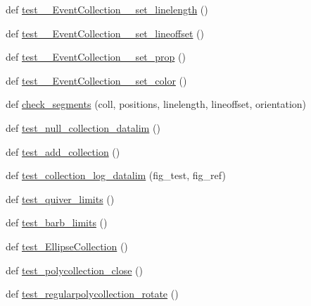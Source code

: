 \begin{DoxyCompactItemize}
\item 
def \hyperlink{namespacematplotlib_1_1tests_1_1test__collections_af6b4833fad5d52aba614b08560a6bb77}{test\+\_\+\+\_\+\+Event\+Collection\+\_\+\+\_\+set\+\_\+linelength} ()
\item 
def \hyperlink{namespacematplotlib_1_1tests_1_1test__collections_a2d8a46d2a0487406a861e6497acc19c7}{test\+\_\+\+\_\+\+Event\+Collection\+\_\+\+\_\+set\+\_\+lineoffset} ()
\item 
def \hyperlink{namespacematplotlib_1_1tests_1_1test__collections_ae122b7fe7b8c0cc3750c0dcf43621996}{test\+\_\+\+\_\+\+Event\+Collection\+\_\+\+\_\+set\+\_\+prop} ()
\item 
def \hyperlink{namespacematplotlib_1_1tests_1_1test__collections_a91efc175c0e126cbe082f3cea61eade2}{test\+\_\+\+\_\+\+Event\+Collection\+\_\+\+\_\+set\+\_\+color} ()
\item 
def \hyperlink{namespacematplotlib_1_1tests_1_1test__collections_ae367299909e7d8974d152b7e0d56e89b}{check\+\_\+segments} (coll, positions, linelength, lineoffset, orientation)
\item 
def \hyperlink{namespacematplotlib_1_1tests_1_1test__collections_af97e3c77c0d05451d621656f7e7c3d27}{test\+\_\+null\+\_\+collection\+\_\+datalim} ()
\item 
def \hyperlink{namespacematplotlib_1_1tests_1_1test__collections_a26cc7e97b0d52ba0c7167510e1150245}{test\+\_\+add\+\_\+collection} ()
\item 
def \hyperlink{namespacematplotlib_1_1tests_1_1test__collections_afba437f619b3bb4b5521586f08089b40}{test\+\_\+collection\+\_\+log\+\_\+datalim} (fig\+\_\+test, fig\+\_\+ref)
\item 
def \hyperlink{namespacematplotlib_1_1tests_1_1test__collections_a62c5c397a791a2b5f17cf2b3259e1539}{test\+\_\+quiver\+\_\+limits} ()
\item 
def \hyperlink{namespacematplotlib_1_1tests_1_1test__collections_a3524385124de4417c3380db9b3920323}{test\+\_\+barb\+\_\+limits} ()
\item 
def \hyperlink{namespacematplotlib_1_1tests_1_1test__collections_a87856a72bd0449245ecc99caa1c57767}{test\+\_\+\+Ellipse\+Collection} ()
\item 
def \hyperlink{namespacematplotlib_1_1tests_1_1test__collections_a65444672bf0694127cd4e6bf086ad97f}{test\+\_\+polycollection\+\_\+close} ()
\item 
def \hyperlink{namespacematplotlib_1_1tests_1_1test__collections_a14eb03fdc440499d6a31e7627b3d7143}{test\+\_\+regularpolycollection\+\_\+rotate} ()

\end{DoxyCompactItemize}
